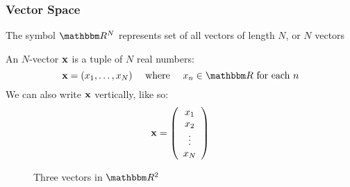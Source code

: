 \begin{frame}
    \frametitle{Vector Space}
    
    \vspace{2em}
    The symbol $\RR^N$ represents set of all vectors of length $N$, or $N$ vectors 

    \vspace{.7em}

    An $N$-vector ${\mathbf x}$ is a tuple of $N$ real numbers:
    $$
    \boldx = (x_1, \ldots, x_N)
        \quad
        \text{ where } 
        \quad x_n \in \RR \text{ for each } n
    $$  
    \vspace{1em}
    We can also write ${\mathbf x}$ vertically, like so: 
    \begin{equation*}
        {\mathbf x} = 
        \left(
        \begin{array}{c}
            x_1 \\
            x_2 \\
            \vdots \\
            x_N
        \end{array}
        \right)
    \end{equation*}
    
\end{frame}

    



\begin{frame}

    \begin{figure}
       \begin{center}
        \caption{Three vectors in $\RR^2$ }
       \end{center}
    \end{figure}

\end{frame}


